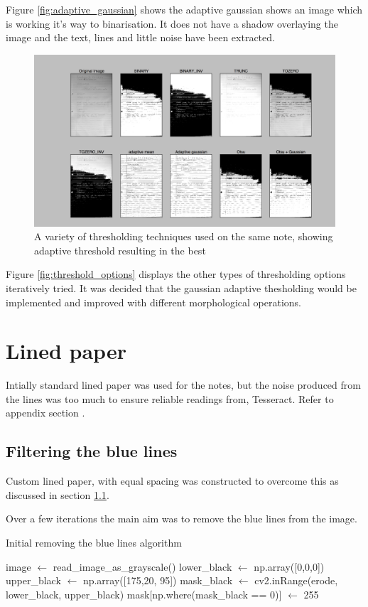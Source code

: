 Figure \ref{fig:adaptive_gaussian} shows the adaptive gaussian shows an image which is working it's way to binarisation. It does not have a shadow overlaying the image and the text, lines and little noise have been extracted.

\begin{figure}[H]
  \centering
  \includegraphics[scale=0.3]{images/thresholding_options}
  \caption{A variety of thresholding techniques used on the same note, showing adaptive threshold resulting in the best}
  \label{fig:thresholding_options}
\end{figure}

Figure \ref{fig:threshold_options} displays the other types of thresholding options iteratively tried. It was decided that the gaussian adaptive thesholding would be implemented and improved with different morphological operations.

\section{Lined paper}
Intially standard lined paper was used for the notes, but the noise produced from the lines was too much to ensure reliable readings from, Tesseract. Refer to appendix \cite{appendix:image_processing} section \cite{processing:pre-line}.

\subsection{Filtering the blue lines}
Custom lined paper, with equal spacing was constructed to overcome this as discussed in section \ref{}.

Over a few iterations the main aim was to remove the blue lines from the image.
\begin{algorithm}
\caption{Initial removing the blue lines algorithm}
\label{algorithm:threshold1}
\begin{algorithmic}[1]
    \State image $\gets$ read\_image\_as\_grayscale()
    \State lower\_black $\gets$ np.array([0,0,0])
    \State upper\_black $\gets$ np.array([175,20, 95])
    \State mask\_black $\gets$ cv2.inRange(erode, lower\_black, upper\_black)
    \State mask[np.where(mask\_black == 0)] $\gets$ 255
  \EndFunction
  \end{algorithmic}
\end{algorithm}

